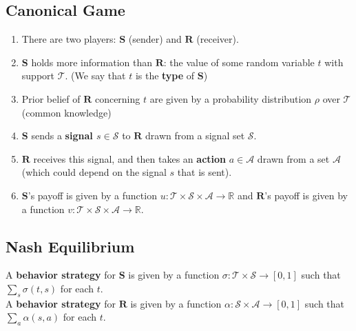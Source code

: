 \documentclass[11pt]{elegantbook}
\begin{document}
\subsection{Canonical Game}
\begin{definition}
    \normalfont
    \begin{enumerate}
        \item There are two players: $\mathbf{S}$ (sender) and $\mathbf{R}$ (receiver).
        \item $\mathbf{S}$ holds more information than $\mathbf{R}$: the value of some random variable $t$ with support $\mathcal{T}$. (We say that $t$ is the \textbf{type} of $\mathbf{S}$)
        \item Prior belief of $\mathbf{R}$ concerning $t$ are given by a probability distribution $\rho$ over $\mathcal{T}$ (common knowledge)
        \item $\mathbf{S}$ sends a \textbf{signal $s\in \mathcal{S}$} to $\mathbf{R}$ drawn from a signal set $\mathcal{S}$.
        \item $\mathbf{R}$ receives this signal, and then takes an \textbf{action} $a\in \mathcal{A}$ drawn from a set $\mathcal{A}$ (which could depend on the signal $s$ that is sent).
        \item $\mathbf{S}$'s payoff is given by a function $u: \mathcal{T}\times \mathcal{S} \times \mathcal{A} \rightarrow \mathbb{R}$ and $\mathbf{R}$'s payoff is given by a function $v: \mathcal{T}\times \mathcal{S} \times \mathcal{A} \rightarrow \mathbb{R}$.
    \end{enumerate}
\end{definition}

\subsection{Nash Equilibrium}
\begin{definition}[Strategy]
    \normalfont
    A \textbf{behavior strategy} for $\mathbf{S}$ is given by a function $\sigma: \mathcal{T}\times\mathcal{S} \rightarrow [0,1]$ such that $\sum_s \sigma(t,s)$ for each $t$.\\
    A \textbf{behavior strategy} for $\mathbf{R}$ is given by a function $\alpha: \mathcal{S}\times\mathcal{A} \rightarrow [0,1]$ such that $\sum_a \alpha(s,a)$ for each $t$.
\end{definition}
\end{document}
